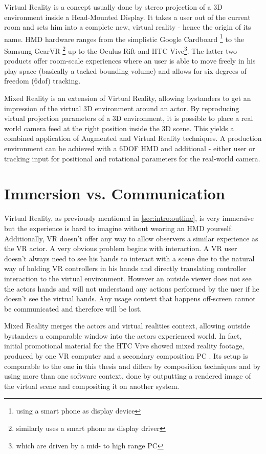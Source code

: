 Virtual Reality is a concept usually done by stereo projection of a 3D 
environment inside a Head-Mounted Display. It takes a user out of the current 
room and sets him into a complete new, virtual reality - hence the origin of 
its name. HMD hardware ranges from the simplistic Google Cardboard 
\footnote{using a smart phone as display device} to the Samsung GearVR 
\footnote{similarly uses a smart phone as display driver} up to the Oculus Rift 
and HTC Vive\footnote{which are driven by a mid- to high range PC}. The latter two products 
offer room-scale experiences where an user is able to move freely in his play 
space (basically a tacked bounding volume) and allows for six degrees of 
freedom (\gls{6dof}) tracking.

Mixed Reality is an extension of Virtual Reality, allowing bystanders to get an 
impression of the virtual 3D environment around an actor. By reproducing 
virtual projection parameters of a 3D environment, it is possible to place a 
real world camera feed at the right position inside the 3D scene. This 
yields a combined application of Augmented and Virtual Reality techniques. A 
production environment can be achieved with a \gls{6DOF} HMD and additional - 
either user or tracking input for positional and rotational parameters for the 
real-world camera. 

\section{Immersion vs. Communication}

Virtual Reality, as previously mentioned in \ref{sec:intro:outline}, is very 
immersive but the experience is hard to imagine without wearing an HMD 
yourself. Additionally, VR doesn't offer any way to allow observers a similar 
experience as the VR actor.
\newline
A very obvious problem begins with interaction. A VR user doesn't always need 
to see his hands to interact with a scene due to the natural way of holding VR 
controllers in his hands and directly translating controller interaction to the
virtual environment. However an outside viewer does not see the actors hands 
and will not understand any actions performed by the user if he doesn't see the 
virtual hands. Any usage context that happens off-screen cannot be communicated 
and therefore will be lost.

Mixed Reality merges the actors and virtual realities context, allowing outside 
bystanders a comparable window into the actors experienced world. In fact, 
initial promotional material for the HTC Vive showed mixed reality footage, 
produced by one VR computer and a secondary composition PC 
\cite{valve:mr-production:2016}. Its setup is comparable to the one in this 
thesis and differs by composition techniques and by using more than one 
software context, done by outputting a rendered image of the virtual scene and 
compositing it on another system.

